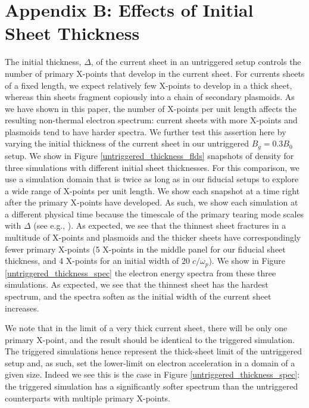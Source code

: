 \section{Appendix B: Effects of Initial Sheet Thickness}\label{thickness}
The initial thickness, $\Delta$, of the current sheet in an untriggered setup controls the number of primary X-points that develop in the current sheet.  For currents sheets of a fixed length, we expect relatively few X-points to develop in a thick sheet, whereas thin sheets fragment copiously into a chain of secondary plasmoids.  As we have shown in this paper, the number of X-points per unit length affects the resulting non-thermal electron spectrum: current sheets with more X-points and plasmoids tend to have harder spectra.  We further test this assertion here by varying the initial thickness of the current sheet in our untriggered $B_{g}=0.3B_{0}$ setup.  We show in Figure \ref{untriggered_thickness_flds} snapshots of density for three simulations with different initial sheet thicknesses.  For this comparison, we use a simulation domain that is twice as long as in our fiducial setups to explore a wide range of X-points per unit length.  We show each snapshot at a time right after the primary X-points have developed.  As such, we show each simulation at a different physical time because the timescale of the primary tearing mode scales with $\Delta$ (see e.g., \citealt{brittnacher1995}).  As expected, we see that the thinnest sheet fractures in a multitude of X-points and plasmoids and the thicker sheets have correspondingly fewer primary X-points (5 X-points in the middle panel for our fiducial sheet thickness, and 4 X-points for an initial width of $20 \; c/\omega_{p}$).  
We show in Figure \ref{untriggered_thickness_spec} the electron energy spectra from these three simulations.  As expected, we see that the thinnest sheet has the hardest spectrum, and the spectra soften as the initial width of the current sheet increases.

We note that in the limit of a very thick current sheet, there will be only one primary X-point, and the result should be identical to the triggered simulation.  The triggered simulations hence represent the thick-sheet limit of the untriggered setup and, as such, set the lower-limit on electron acceleration in a domain of a given size.  Indeed we see this is the case in Figure \ref{untriggered_thickness_spec}: the triggered simulation has a significantly softer spectrum than the untriggered counterparts with multiple primary X-points.

